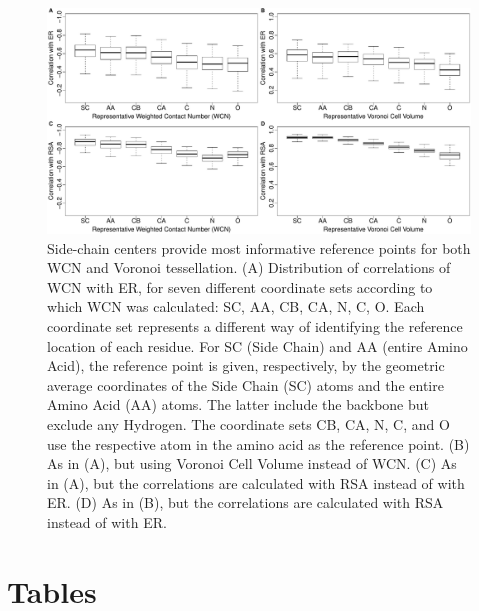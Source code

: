 \documentclass[12pt]{article}
\begin{document}
    \begin{figure}
        \begin{center}
        \includegraphics[width=6.5in]{best_wcn_vvol_boxplot.pdf}
        \end{center}
        \caption{Side-chain centers provide most informative reference points for both WCN and Voronoi tessellation. (A) Distribution of correlations of WCN with ER, for seven different coordinate sets according to which WCN was calculated: SC, AA, CB, CA, N, C, O. Each coordinate set represents a different way of identifying the reference location of each residue. For SC (Side Chain) and AA (entire Amino Acid), the reference point is given, respectively, by the geometric average coordinates of the Side Chain (SC) atoms and the entire Amino Acid (AA) atoms. The latter include the backbone but exclude any Hydrogen. The coordinate sets CB, CA, N, C, and O use the respective atom in the amino acid as the reference point. (B) As in (A), but using Voronoi Cell Volume instead of WCN. (C) As in (A), but the correlations are calculated with RSA instead of with ER. (D) As in (B), but the correlations are calculated with RSA instead of with ER.}
        \label{fig:best_wcn_vvol}
    \end{figure}


\cleardoublepage

\section*{Tables}
\end{document}
